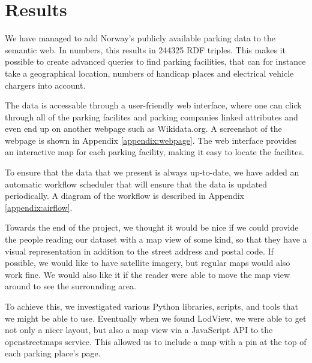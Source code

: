 \chapter{Results}
We have managed to add Norway's publicly available parking data to the semantic web. In numbers, this results in 244325 RDF triples. This makes it possible to create advanced queries to find parking facilities, that can for instance take a geographical location, numbers of handicap places and electrical vehicle chargers into account.

The data is accessable through a user-friendly web interface, where one can click through all of the parking facilites and parking companies linked attributes and even end up on another webpage such as Wikidata.org. A screenshot of the webpage is shown in Appendix \ref{appendix:webpage}. The web interface provides an interactive map for each parking facility, making it easy to locate the facilites.

To ensure that the data that we present is always up-to-date, we have added an automatic workflow scheduler that will ensure that the data is updated periodically. A diagram of the workflow is described in Appendix \ref{appendix:airflow}.

\vspace{5mm}

Towards the end of the project, we thought it would be nice if we could provide the people reading our dataset with a map view of some kind, so that they have a visual representation in addition to the street address and postal code. If possible, we would like to have satellite imagery, but regular maps would also work fine. We would also like it if the reader were able to move the map view around to see the surrounding area.

To achieve this, we investigated various Python libraries, scripts, and tools that we might be able to use. Eventually when we found LodView, we were able to get not only a nicer layout, but also a map view via a JavaScript API to the openstreetmaps service. This allowed us to include a map with a pin at the top of each parking place’s page.
